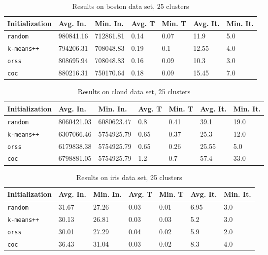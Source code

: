 \begin{table}[h]
	\begin{center}
		\begin{tabular}{|l|l|l|l|l|l|l|}
			\hline
			Initialization & Avg. In. & Min. In. & Avg. T & Min. T & Avg. It. & Min. It.\\\hline
			\texttt{random} & 980841.16 & 712861.81 & 0.14 & 0.07 & 11.9 & 5.0\\\hline
			\texttt{k-means++} & 794206.31 & 708048.83 & 0.19 & 0.1 & 12.55 & 4.0\\\hline
			\texttt{orss} & 808695.94 & 708048.83 & 0.16 & 0.09 & 10.3 & 3.0\\\hline
			\texttt{coc} & 880216.31 & 750170.64 & 0.18 & 0.09 & 15.45 & 7.0\\\hline
		\end{tabular}
		\caption{Results on boston data set, 25 clusters}
		\label{tbl:boston25}
	\end{center}
\end{table}

\begin{table}[h]
	\begin{center}
		\begin{tabular}{|l|l|l|l|l|l|l|}
			\hline
			Initialization & Avg. In. & Min. In. & Avg. T & Min. T & Avg. It. & Min. It.\\\hline
			\texttt{random} & 8060421.03 & 6080623.47 & 0.8 & 0.41 & 39.1 & 19.0\\\hline
			\texttt{k-means++} & 6307066.46 & 5754925.79 & 0.65 & 0.37 & 25.3 & 12.0\\\hline
			\texttt{orss} & 6179838.38 & 5754925.79 & 0.65 & 0.26 & 25.55 & 5.0\\\hline
			\texttt{coc} & 6798881.05 & 5754925.79 & 1.2 & 0.7 & 57.4 & 33.0\\\hline
		\end{tabular}
		\caption{Results on cloud data set, 25 clusters}
		\label{tbl:cloud25}
	\end{center}
\end{table}

\begin{table}[h]
	\begin{center}
		\begin{tabular}{|l|l|l|l|l|l|l|}
			\hline
			Initialization & Avg. In. & Min. In. & Avg. T & Min. T & Avg. It. & Min. It.\\\hline
			\texttt{random} & 31.67 & 27.26 & 0.03 & 0.01 & 6.95 & 3.0\\\hline
			\texttt{k-means++} & 30.13 & 26.81 & 0.03 & 0.03 & 5.2 & 3.0\\\hline
			\texttt{orss} & 30.01 & 27.29 & 0.04 & 0.02 & 5.9 & 2.0\\\hline
			\texttt{coc} & 36.43 & 31.04 & 0.03 & 0.02 & 8.3 & 4.0\\\hline
		\end{tabular}
		\caption{Results on iris data set, 25 clusters}
		\label{tbl:iris25}
	\end{center}
\end{table}

